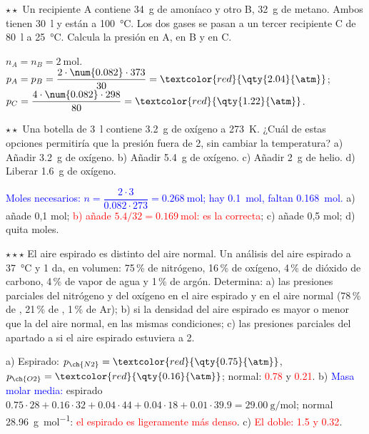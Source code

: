 \begin{exercise}
    \(\star\star\) Un recipiente A contiene \qty{34}{\gram} de amoníaco y otro B, \qty{32}{\gram} de metano. Ambos tienen \qty{30}{\litre} y están a
    \qty{100}{\degreeCelsius}. Los dos gases se pasan a un tercer recipiente C de \qty{80}{\litre} a \qty{25}{\degreeCelsius}. Calcula la presión
    en A, en B y en C.
    \begin{solu}
        \(n_A = n_B = \qty{2}{\mole}\). \(p_A = p_B = \dfrac{2 \cdot \num{0.082} \cdot 373}{30} = \textcolor{red}{\qty{2.04}{\atm}}\);
        \(p_C = \dfrac{4 \cdot \num{0.082} \cdot 298}{80} = \textcolor{red}{\qty{1.22}{\atm}}\).
    \end{solu}
\end{exercise}

\begin{exercise}
    \(\star\star\) Una botella de \qty{3}{\litre} contiene \qty{3.2}{\gram} de oxígeno a \qty{273}{\kelvin}. ¿Cuál de estas opciones permitiría
    que la presión fuera de \qty{2}{\atm}, sin cambiar la temperatura? a) Añadir \qty{3.2}{\gram} de oxígeno. b) Añadir \qty{5.4}{\gram} de
    oxígeno. c) Añadir \qty{2}{\gram} de helio. d) Liberar \qty{1.6}{\gram} de oxígeno.
    \begin{solu}
        \textcolor{blue}{Moles necesarios: \(n = \dfrac{2 \cdot 3}{\num{0.082} \cdot 273} = \qty{0.268}{\mole}\); hay \qty{0.1}{\mole}, faltan
        \qty{0.168}{\mole}.} a) añade 0,1 mol; \textcolor{red}{b) añade \(\num{5.4}/32 = \qty{0.169}{\mole}\): es la correcta}; c) añade 0,5 mol;
        d) quita moles.
    \end{solu}
\end{exercise}

\begin{exercise}
    \(\star\star\star\) El aire espirado es distinto del aire normal. Un análisis del aire espirado a \qty{37}{\degreeCelsius} y \qty{1}{\atm} da, en
    volumen: 75\,\% de nitrógeno, 16\,\% de oxígeno, 4\,\% de dióxido de carbono, 4\,\% de vapor de agua y 1\,\% de argón. Determina:
    a) las presiones parciales del nitrógeno y del oxígeno en el aire espirado y en el aire normal (78\,\% de , 21\,\% de ,
    1\,\% de Ar); b) si la densidad del aire espirado es mayor o menor que la del aire normal, en las mismas condiciones;
    c) las presiones parciales del apartado a si el aire espirado estuviera a \qty{2}{\atm}.
    \begin{solu}
        a) Espirado: \(p_{\ch{N2}} = \textcolor{red}{\qty{0.75}{\atm}}\), \(p_{\ch{O2}} = \textcolor{red}{\qty{0.16}{\atm}}\); normal: \textcolor{red}{\qty{0.78}{\atm}} y
        \textcolor{red}{\qty{0.21}{\atm}}.
        b) \textcolor{blue}{Masa molar media:} espirado \(\num{0.75} \cdot 28 + \num{0.16} \cdot 32 + \num{0.04} \cdot 44 + \num{0.04} \cdot 18 + \num{0.01} \cdot \num{39.9} =
        \qty{29.00}{\gram\per\mole}\); normal \qty{28.96}{\gram\per\mole}: \textcolor{red}{el espirado es ligeramente más denso}.
        c) \textcolor{red}{El doble: \qty{1.5}{\atm} y \qty{0.32}{\atm}}.
    \end{solu}
\end{exercise}
